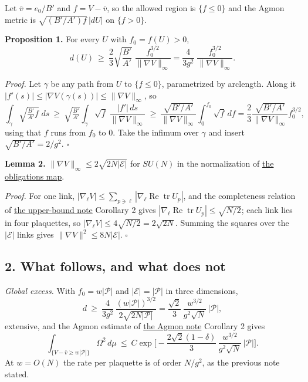 \documentclass[11pt,a4paper]{article}
\begin{document}
Let \(\bar v=e_0/B'\) and \(f=V-\bar v\), so the allowed region is
\(\{f\le0\}\) and the Agmon metric is \(\sqrt{(B'/A')f}\,|dU|\) on
\(\{f>0\}\).

\textbf{Proposition 1.} For every \(U\) with \(f_0=f(U)>0\),
\[d(U)\ \ge\ \frac{2}{3}\sqrt{\frac{B'}{A'}}\;\frac{f_0^{3/2}}{\|\nabla V\|_\infty}
=\frac{4}{3g^2}\;\frac{f_0^{3/2}}{\|\nabla V\|_\infty}.\]

\emph{Proof.} Let \(\gamma\) be any path from \(U\) to \(\{f\le0\}\),
parametrized by arclength. Along it
\(|f'(s)|\le|\nabla V(\gamma(s))|\le\|\nabla V\|_\infty\), so
\[\int_\gamma\sqrt{\tfrac{B'}{A'}f}\;ds
\ \ge\ \sqrt{\tfrac{B'}{A'}}\int_\gamma\sqrt{f}\;\frac{|f'|\,ds}{\|\nabla V\|_\infty}
\ \ge\ \frac{\sqrt{B'/A'}}{\|\nabla V\|_\infty}\int_0^{f_0}\sqrt f\,df
=\frac{2}{3}\frac{\sqrt{B'/A'}}{\|\nabla V\|_\infty}f_0^{3/2},\] using
that \(f\) runs from \(f_0\) to \(0\). Take the infimum over \(\gamma\)
and insert \(\sqrt{B'/A'}=2/g^2\). \(\square\)

\textbf{Lemma 2.} \(\|\nabla V\|_\infty\le2\sqrt{2N|\mathcal E|}\) for
\(SU(N)\) in the normalization of
\href{mass-gap-obligations-lattice.md}{the obligations map}.

\emph{Proof.} For one link,
\(|\nabla_\ell V|\le\sum_{p\ni\ell}|\nabla_\ell\operatorname{Re}\operatorname{tr}U_p|\),
and the completeness relation of \href{lattice-gap-upper-bounds.md}{the
upper-bound note} Corollary 2 gives
\(|\nabla_\ell\operatorname{Re}\operatorname{tr}U_p|\le\sqrt{N/2}\);
each link lies in four plaquettes, so
\(|\nabla_\ell V|\le4\sqrt{N/2}=2\sqrt{2N}\). Summing the squares over
the \(|\mathcal E|\) links gives \(\|\nabla V\|^2\le8N|\mathcal E|\).
\(\square\)

\hypertarget{what-follows-and-what-does-not}{%
\subsection{2. What follows, and what does
not}\label{what-follows-and-what-does-not}}

\emph{Global excess.} With \(f_0=w|\mathcal P|\) and
\(|\mathcal E|=|\mathcal P|\) in three dimensions,
\[d\ \ge\ \frac{4}{3g^2}\,\frac{(w|\mathcal P|)^{3/2}}{2\sqrt{2N|\mathcal P|}}
=\frac{\sqrt2}{3}\,\frac{w^{3/2}}{g^2\sqrt N}\,|\mathcal P| ,\]
extensive, and the Agmon estimate of
\href{agmon-ground-state-suppression.md}{the Agmon note} Corollary 2
gives \[\int_{\{V-\bar v\ge w|\mathcal P|\}}\Omega^2\,d\mu
\ \le\ C\exp\Big[-\frac{2\sqrt2(1-\delta)}{3}\,\frac{w^{3/2}}{g^2\sqrt N}\,|\mathcal P|\Big].\]
At \(w=O(N)\) the rate per plaquette is of order \(N/g^2\), as the
previous note stated.
\end{document}
